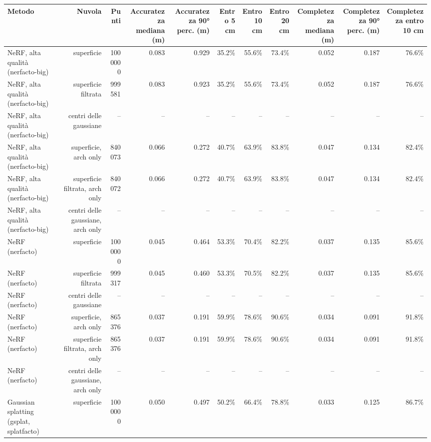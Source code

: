 \begin{tabular}{lrrrrrrrrrr}
\toprule
Metodo & Nuvola & Punti & Accuratezza mediana (m) & Accuratezza 90° perc. (m) & Entro 5 cm & Entro 10 cm & Entro 20 cm & Completezza mediana (m) & Completezza 90° perc. (m) & Completezza entro 10 cm \\
\midrule
NeRF, alta qualità (nerfacto-big) & superficie & 1000000 & 0.083 & 0.929 & 35.2\% & 55.6\% & 73.4\% & 0.052 & 0.187 & 76.6\% \\
NeRF, alta qualità (nerfacto-big) & superficie filtrata & 999581 & 0.083 & 0.923 & 35.2\% & 55.6\% & 73.4\% & 0.052 & 0.187 & 76.6\% \\
NeRF, alta qualità (nerfacto-big) & centri delle gaussiane & -- & -- & -- & -- & -- & -- & -- & -- & -- \\
NeRF, alta qualità (nerfacto-big) & superficie, arch only & 840073 & 0.066 & 0.272 & 40.7\% & 63.9\% & 83.8\% & 0.047 & 0.134 & 82.4\% \\
NeRF, alta qualità (nerfacto-big) & superficie filtrata, arch only & 840072 & 0.066 & 0.272 & 40.7\% & 63.9\% & 83.8\% & 0.047 & 0.134 & 82.4\% \\
NeRF, alta qualità (nerfacto-big) & centri delle gaussiane, arch only & -- & -- & -- & -- & -- & -- & -- & -- & -- \\
NeRF (nerfacto) & superficie & 1000000 & 0.045 & 0.464 & 53.3\% & 70.4\% & 82.2\% & 0.037 & 0.135 & 85.6\% \\
NeRF (nerfacto) & superficie filtrata & 999317 & 0.045 & 0.460 & 53.3\% & 70.5\% & 82.2\% & 0.037 & 0.135 & 85.6\% \\
NeRF (nerfacto) & centri delle gaussiane & -- & -- & -- & -- & -- & -- & -- & -- & -- \\
NeRF (nerfacto) & superficie, arch only & 865376 & 0.037 & 0.191 & 59.9\% & 78.6\% & 90.6\% & 0.034 & 0.091 & 91.8\% \\
NeRF (nerfacto) & superficie filtrata, arch only & 865376 & 0.037 & 0.191 & 59.9\% & 78.6\% & 90.6\% & 0.034 & 0.091 & 91.8\% \\
NeRF (nerfacto) & centri delle gaussiane, arch only & -- & -- & -- & -- & -- & -- & -- & -- & -- \\
Gaussian splatting (gsplat, splatfacto) & superficie & 1000000 & 0.050 & 0.497 & 50.2\% & 66.4\% & 78.8\% & 0.033 & 0.125 & 86.7\% \\

\end{tabular}
